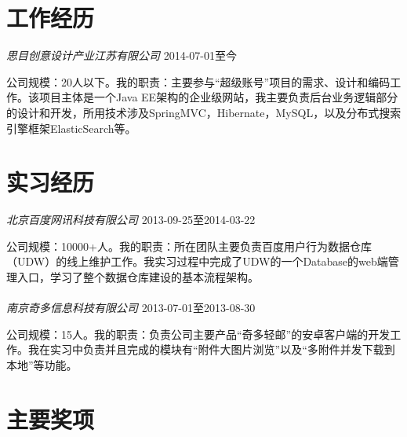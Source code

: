 \documentclass[10pt]{article} %
\begin{document}
{\begin{minipage}[t]{0.44\textwidth}

\section{工作经历} 

{\large \textit{思目创意设计产业江苏有限公司}} \hfill  \hfill {\textsc{2014-07-01至今}}

\normalsize{公司规模：20人以下。我的职责：主要参与“超级账号”项目的需求、设计和编码工作。该项目主体是一个Java EE架构的企业级网站，我主要负责后台业务逻辑部分的设计和开发，所用技术涉及SpringMVC，Hibernate，MySQL，以及分布式搜索引擎框架ElasticSearch等。}\\



\section{实习经历} 

{\large \textit{北京百度网讯科技有限公司}} \hfill  \hfill {\textsc{2013-09-25至2014-03-22}}

\normalsize{公司规模：10000+人。我的职责：所在团队主要负责百度用户行为数据仓库（UDW）的线上维护工作。我实习过程中完成了UDW的一个Database的web端管理入口，学习了整个数据仓库建设的基本流程架构。}\\\\
{\large \textit{南京奇多信息科技有限公司}} \hfill  \hfill {\textsc{2013-07-01至2013-08-30}}

\normalsize{公司规模：15人。我的职责：负责公司主要产品“奇多轻邮”的安卓客户端的开发工作。我在实习中负责并且完成的模块有“附件大图片浏览”以及“多附件并发下载到本地”等功能。}\\ 


\section{主要奖项} 

\begin{tabular}{rl}


\end{tabular}
\end{minipage}}
\end{document}
